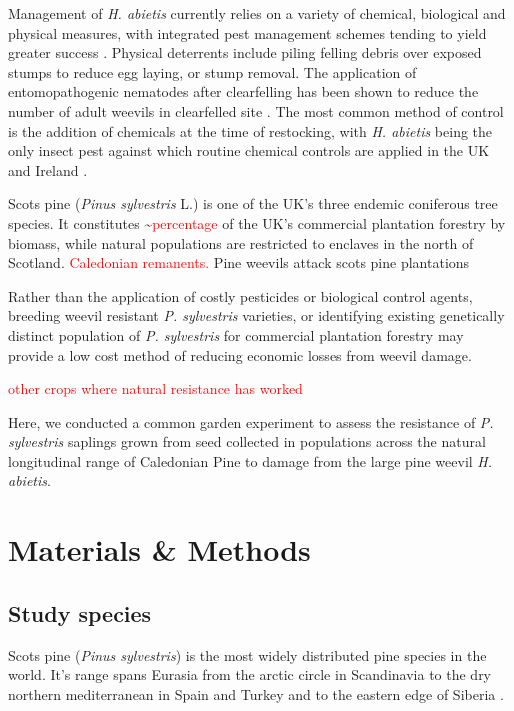 \documentclass[a4paper, 11pt]{article}
\newcommand{\todo}[1]{\textcolor{red}{#1}}   %
\begin{document}
Management of \textit{H. abietis} currently relies on a variety of chemical, biological and physical measures, with integrated pest management schemes tending to yield greater success \citep{}. Physical deterrents include piling felling debris over exposed stumps to reduce egg laying, or stump removal. The application of entomopathogenic nematodes after clearfelling has been shown to reduce the number of adult weevils in clearfelled site \citep{Dillon2006}. The most common method of control is the addition of chemicals at the time of restocking, with \textit{H. abietis} being the only insect pest against which routine chemical controls are applied in the UK and Ireland \citep{Willoughby2004}.  

Scots pine (\textit{Pinus sylvestris} L.) is one of the UK's three endemic coniferous tree species. It constitutes \textasciitilde{}\todo{percentage} of the UK's commercial plantation forestry by biomass, while natural populations are restricted to enclaves in the north of Scotland. \todo{Caledonian remanents.} Pine weevils attack scots pine plantations  

Rather than the application of costly pesticides or biological control agents, breeding weevil resistant \textit{P. sylvestris} varieties, or identifying existing genetically distinct population of \textit{P. sylvestris} for commercial plantation forestry may provide a low cost method of reducing economic losses from weevil damage.

\todo{other crops where natural resistance has worked}

Here, we conducted a common garden experiment to assess the resistance of \textit{P. sylvestris} saplings grown from seed collected in populations across the natural longitudinal range of Caledonian Pine to damage from the large pine weevil \textit{H. abietis}. 


\section*{Materials \& Methods}

\subsection*{Study species}

Scots pine (\textit{Pinus sylvestris}) is the most widely distributed pine species in the world. It's range spans Eurasia from the arctic circle in Scandinavia to the dry northern mediterranean in Spain and Turkey and to the eastern edge of Siberia \citep{Carlisle1968}. 
\end{document}
